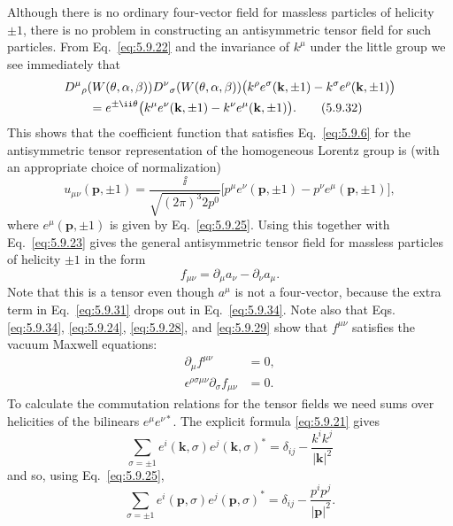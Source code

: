 Although there is no ordinary four-vector field for massless particles of
helicity $\pm1$, there is no problem in constructing an antisymmetric tensor
field for such particles. From Eq.~\eqref{eq:5.9.22} and the invariance of $k^\mu$ under
the little group we see immediately that
\begin{align}
&D^\mu{}_\rho(W(\theta,\alpha,\beta))
D^\nu{}_\sigma(W(\theta,\alpha,\beta))
\bigl(k^\rho e^\sigma(\mathbf k,\pm1)-k^\sigma e^\rho(\mathbf k,\pm1)\bigr)
\notag\\
&\qquad=e^{\pm \ii\theta}
\bigl(k^\mu e^\nu(\mathbf k,\pm1)-k^\nu e^\mu(\mathbf k,\pm1)\bigr).
\tag{5.9.32}\label{eq:5.9.32}
\end{align}
This shows that the coefficient function that satisfies Eq.~\eqref{eq:5.9.6} for the
antisymmetric tensor representation of the homogeneous Lorentz group is (with
an appropriate choice of normalization)
\begin{equation}
u_{\mu\nu}(\mathbf p,\pm1)=\frac{\ii}{\sqrt{(2\pi)^3 2p^0}}
\bigl[p^\mu e^\nu(\mathbf p,\pm1)-p^\nu e^\mu(\mathbf p,\pm1)\bigr],
\tag{5.9.33}\label{eq:5.9.33}
\end{equation}
where $e^\mu(\mathbf p,\pm1)$ is given by Eq.~\eqref{eq:5.9.25}. Using this together
with Eq.~\eqref{eq:5.9.23} gives the general antisymmetric tensor field for massless
particles of helicity $\pm1$ in the form
\begin{equation}
f_{\mu\nu}=\partial_\mu a_\nu-\partial_\nu a_\mu.
\tag{5.9.34}\label{eq:5.9.34}
\end{equation}
Note that this is a tensor even though $a^\mu$ is not a four-vector, because
the extra term in Eq.~\eqref{eq:5.9.31} drops out in Eq.~\eqref{eq:5.9.34}. Note also that Eqs.
\eqref{eq:5.9.34}, \eqref{eq:5.9.24}, \eqref{eq:5.9.28}, and \eqref{eq:5.9.29} show that $f^{\mu\nu}$ satisfies the
vacuum Maxwell equations:
\begin{align}
\partial_\mu f^{\mu\nu}&=0,
\tag{5.9.35}\label{eq:5.9.35}\\
\epsilon^{\rho\sigma\mu\nu}\partial_\sigma f_{\mu\nu}&=0.
\tag{5.9.36}\label{eq:5.9.36}
\end{align}
To calculate the commutation relations for the tensor fields we need sums over
helicities of the bilinears $e^\mu e^{\nu*}$. The explicit formula \eqref{eq:5.9.21}
gives
\[
\sum_{\sigma=\pm1}e^i(\mathbf k,\sigma)e^j(\mathbf k,\sigma)^*
=\delta_{ij}-\frac{k^ik^j}{|\mathbf k|^2}
\]
and so, using Eq.~\eqref{eq:5.9.25},
\begin{equation}
\sum_{\sigma=\pm1}e^i(\mathbf p,\sigma)e^j(\mathbf p,\sigma)^*
=\delta_{ij}-\frac{p^ip^j}{|\mathbf p|^2}.
\tag{5.9.37}\label{eq:5.9.37}
\end{equation}
